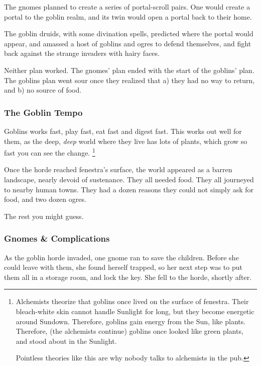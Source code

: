 \begin{multicols}{2}
\begin{exampletext}
  The gnomes planned to create a series of portal-scroll pairs.
  One would create a portal to the goblin realm, and its twin would open a portal back to their home.

  The goblin druids, with some divination spells, predicted where the portal would appear, and amassed a host of goblins and ogres to defend themselves, and fight back against the strange invaders with hairy faces. 

  Neither plan worked.
  The gnomes' plan ended with the start of the goblins' plan.
  The goblins plan went sour once they realized that a) they had no way to return, and b) no source of food.

  \subsubsection{The Goblin Tempo}
  Goblins works fast, play fast, eat fast and digest fast.
  This works out well for them, as the deep, \emph{deep} world where they live has lots of plants, which grow so fast you can see the change.%
  \footnote{Alchemists theorize that goblins once lived on the surface of \gls{fenestra}.
  Their bleach-white skin cannot handle Sunlight for long, but they become energetic around Sundown.
  Therefore, goblins gain energy from the Sun, like plants.
  Therefore, (the alchemists continue) goblins once looked like green plants, and stood about in the Sunlight.

  Pointless theories like this are why nobody talks to alchemists in the pub.}


  Once the horde reached \gls{fenestra}'s surface, the world appeared as a barren landscape, nearly devoid of sustenance.
  They all needed food.
  They all journeyed to nearby human towns.
  They had a dozen reasons they could not simply ask for food, and two dozen ogres.

  The rest you might guess.

\end{exampletext}


\subsubsection{Gnomes \& Complications}
\label{saving_the_children}

\begin{exampletext}
  As the goblin horde invaded, one gnome ran to save the children.
  Before she could leave with them, she found herself trapped, so her next step was to put them all in a storage room, and lock the key.
  She fell to the horde, shortly after.


\end{exampletext}
\end{multicols}
